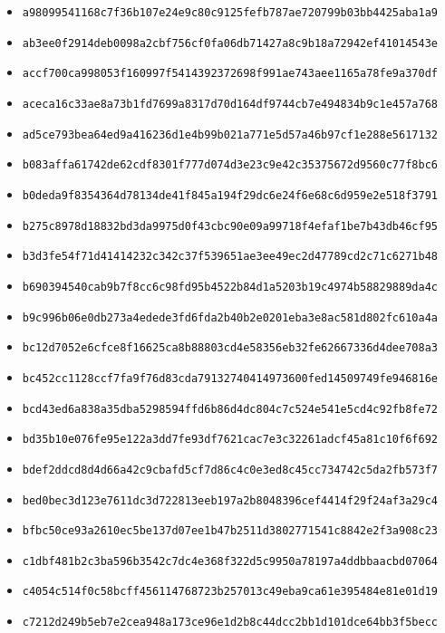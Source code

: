 {\begin{itemize}
    \item \texttt{a98099541168c7f36b107e24e9c80c9125fefb787ae720799b03bb4425aba1a9}
    \item \texttt{ab3ee0f2914deb0098a2cbf756cf0fa06db71427a8c9b18a72942ef41014543e}
    \item \texttt{accf700ca998053f160997f5414392372698f991ae743aee1165a78fe9a370df}
    \item \texttt{aceca16c33ae8a73b1fd7699a8317d70d164df9744cb7e494834b9c1e457a768}
    \item \texttt{ad5ce793bea64ed9a416236d1e4b99b021a771e5d57a46b97cf1e288e5617132}
    \item \texttt{b083affa61742de62cdf8301f777d074d3e23c9e42c35375672d9560c77f8bc6}
    \item \texttt{b0deda9f8354364d78134de41f845a194f29dc6e24f6e68c6d959e2e518f3791}
    \item \texttt{b275c8978d18832bd3da9975d0f43cbc90e09a99718f4efaf1be7b43db46cf95}
    \item \texttt{b3d3fe54f71d41414232c342c37f539651ae3ee49ec2d47789cd2c71c6271b48}
    \item \texttt{b690394540cab9b7f8cc6c98fd95b4522b84d1a5203b19c4974b58829889da4c}
    \item \texttt{b9c996b06e0db273a4edede3fd6fda2b40b2e0201eba3e8ac581d802fc610a4a}
    \item \texttt{bc12d7052e6cfce8f16625ca8b88803cd4e58356eb32fe62667336d4dee708a3}
    \item \texttt{bc452cc1128ccf7fa9f76d83cda79132740414973600fed14509749fe946816e}
    \item \texttt{bcd43ed6a838a35dba5298594ffd6b86d4dc804c7c524e541e5cd4c92fb8fe72}
    \item \texttt{bd35b10e076fe95e122a3dd7fe93df7621cac7e3c32261adcf45a81c10f6f692}
    \item \texttt{bdef2ddcd8d4d66a42c9cbafd5cf7d86c4c0e3ed8c45cc734742c5da2fb573f7}
    \item \texttt{bed0bec3d123e7611dc3d722813eeb197a2b8048396cef4414f29f24af3a29c4}
    \item \texttt{bfbc50ce93a2610ec5be137d07ee1b47b2511d3802771541c8842e2f3a908c23}
    \item \texttt{c1dbf481b2c3ba596b3542c7dc4e368f322d5c9950a78197a4ddbbaacbd07064}
    \item \texttt{c4054c514f0c58bcff456114768723b257013c49eba9ca61e395484e81e01d19}
    \item \texttt{c7212d249b5eb7e2cea948a173ce96e1d2b8c44dcc2bb1d101dce64bb3f5becc}

\end{itemize}}
